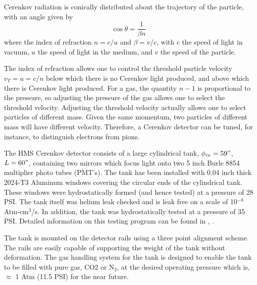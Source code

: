 Cerenkov radiation is conically distributed about the trajectory of the
particle, with an angle given by
$$
	\cos{\theta} = \frac{1}{\beta n}
$$
where the index of refraction $n = c/u$ and $\beta = v/c$, with $c$
the speed of light in vacuum, $u$ the speed of light in the medium,
and $v$ the speed of the particle.

The index of refraction allows one to control the threshold particle velocity
$v_{T}=u=c/n$ below which there is no Cerenkov light produced, and above which there
is Cerenkov light produced.  For a gas, the quantity $n-1$ is proportional to the pressure,
so adjusting the pressure of the gas allows one to select the
threshold velocity. Adjusting the threshold velocity actually allows one to select particles of
different mass.  Given the same momentum, two particles of different mass
will have different velocity.  Therefore, a Cerenkov detector can be tuned,
for instance, to distinguish electrons from pions.

	The HMS Cerenkov detector consists of a large cylindrical
tank, $\phi_{in} = 59"$, $L = 60"$, containing two mirrors which focus
light onto two 5 inch Burle 8854 multiplier photo  tubes (PMT's). The tank
has been installed with 0.04 inch thick 2024-T3 Aluminum windows
covering the circular ends of the cylindrical tank. These
windows were hydrostatically formed (and hence tested) at a pressure
of 28 PSI. The tank itself was helium leak checked and is leak free
on a scale of 10$^{-8}$ Atm-cm$^3$/s. In addition, the tank was hydrostatically
tested at a pressure of 35 PSI. Detailed information on this testing
program can be found in \cite {bi:tank}, \cite {bi:wind}.

The tank is mounted on the detector rails using a three point
alignment scheme. The rails are easily capable of supporting the
weight of the tank without deformation.
The gas handling system for the tank
is designed to enable the tank to be filled with
pure gas, CO2 or N$_2$, at the desired operating
pressure which is, $\approx$ 1 Atm (11.5 PSI) for the near future.

